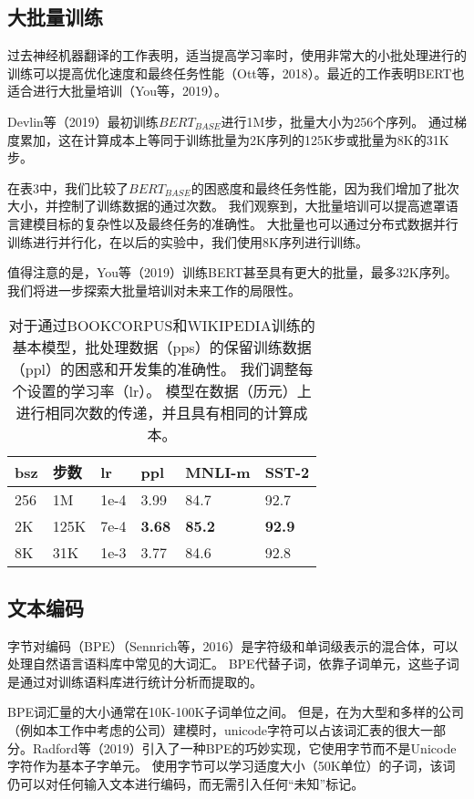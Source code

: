 \documentclass[lang=cn,11pt,a4paper,twocolumn]{elegantpaper}
\begin{document}
\subsection{大批量训练}
过去神经机器翻译的工作表明，适当提高学习率时，使用非常大的小批处理进行的训练可以提高优化速度和最终任务性能（Ott等，2018）。最近的工作表明BERT也适合进行大批量培训（You等，2019）。

Devlin等（2019）最初训练$BERT_{BASE}$进行1M步，批量大小为256个序列。
通过梯度累加，这在计算成本上等同于训练批量为2K序列的125K步或批量为8K的31K步。

在表3中，我们比较了$BERT_{BASE}$的困惑度和最终任务性能，因为我们增加了批次大小，并控制了训练数据的通过次数。 我们观察到，大批量培训可以提高遮罩语言建模目标的复杂性以及最终任务的准确性。 大批量也可以通过分布式数据并行训练进行并行化，在以后的实验中，我们使用8K序列进行训练。

值得注意的是，You等（2019）训练BERT甚至具有更大的批量，最多32K序列。 我们将进一步探索大批量培训对未来工作的局限性。

\begin{table}[]
  \centering
  \begin{tabular}{llllll}
  \hline
  \textbf{bsz} & 步数   & \textbf{lr} & \textbf{ppl}  & \textbf{MNLI-m} & \textbf{SST-2} \\ \hline
  256          & 1M   & 1e-4        & 3.99          & 84.7            & 92.7           \\
  2K           & 125K & 7e-4        & \textbf{3.68} & \textbf{85.2}   & \textbf{92.9}  \\
  8K           & 31K  & 1e-3        & 3.77          & 84.6            & 92.8           \\ \hline
  \end{tabular}
  \caption{对于通过BOOKCORPUS和WIKIPEDIA训练的基本模型，批处理数据（pps）的保留训练数据（ppl）的困惑和开发集的准确性。 我们调整每个设置的学习率（lr）。 模型在数据（历元）上进行相同次数的传递，并且具有相同的计算成本。}
  \end{table}

\subsection{文本编码}
字节对编码（BPE）（Sennrich等，2016）是字符级和单词级表示的混合体，可以处理自然语言语料库中常见的大词汇。 BPE代替子词，依靠子词单元，这些子词是通过对训练语料库进行统计分析而提取的。

BPE词汇量的大小通常在10K-100K子词单位之间。 但是，在为大型和多样的公司（例如本工作中考虑的公司）建模时，unicode字符可以占该词汇表的很大一部分。Radford等（2019）引入了一种BPE的巧妙实现，它使用字节而不是Unicode字符作为基本子字单元。 使用字节可以学习适度大小（50K单位）的子词，该词仍可以对任何输入文本进行编码，而无需引入任何“未知”标记。
\end{document}
